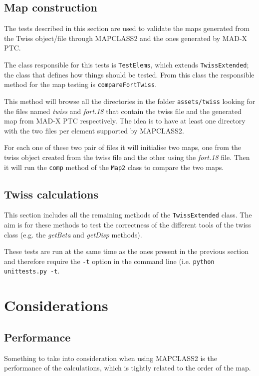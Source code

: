\documentclass[a4paper]{cernatsnote}
\begin{document}
\subsection{Map construction}
The tests described in this section are used to validate the maps
generated from the Twiss object/file through \textsc{MAPCLASS2} and
the ones generated by MAD-X PTC.

The class responsible for this tests is \texttt{TestElems}, which
extends \texttt{TwissExtended}; the class that defines how things
should be tested. From this class the responsible method for the map
testing is \texttt{compareFortTwiss}.

This method will browse all the directories in the folder
\texttt{assets/twiss} looking for the files named \textit{twiss} and
\textit{fort.18} that contain the twiss file and the generated map
from MAD-X PTC respectively. The idea is to have at least one directory
with the two files per element supported by \textsc{MAPCLASS2}.

For each one of these two pair of files it will initialise two maps,
one from the twiss object created from the twiss file and the other
using the \textit{fort.18} file. Then it will run the \texttt{comp}
method of the \texttt{Map2} class to compare the two maps.

\subsection{Twiss calculations}
This section includes all the remaining methods of the
\texttt{TwissExtended} class. The aim is for these methods to test the
correctness of the different tools of the twiss class (e.g. the
\textit{getBeta} and \textit{getDisp} methods).

These tests are run at the same time as the ones present in the
previous section and therefore require the \texttt{-t} option in the
command line (i.e. \texttt{python unittests.py -t}.

\section{Considerations}

\subsection{Performance}
Something to take into consideration when using \textsc{MAPCLASS2} is
the performance of the calculations, which is tightly related to the
order of the map.
\end{document}
